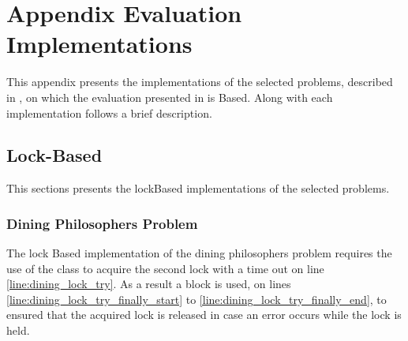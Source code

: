 \chapter[]{Appendix Evaluation Implementations}
This appendix presents the implementations of the selected problems, described in , on which the evaluation presented in  is Based. Along with each implementation follows a brief description.
\label{app:eval_implementations}

\section{Lock-Based}\label{app:impl_lockBased}
This sections presents the lockBased implementations of the selected problems.

\subsection{Dining Philosophers Problem}
The lock Based implementation of the dining philosophers problem requires the use of the  class to acquire the second lock with a time out on line \ref{line:dining_lock_try}. As a result a  block is used, on lines \ref{line:dining_lock_try_finally_start} to \ref{line:dining_lock_try_finally_end}, to ensured that the acquired lock is released in case an error occurs while the lock is held.
